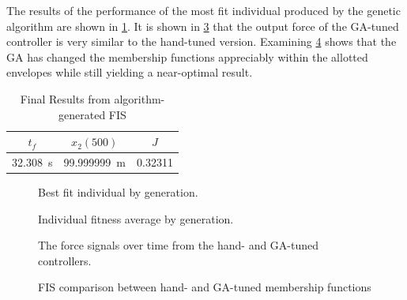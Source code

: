 The results of the performance of the most fit individual produced by the genetic algorithm are shown in
\cref{tab:garesult}. It is shown in \cref{f:accforcecomp} that the output force of the GA-tuned controller is
very similar to the hand-tuned version. Examining \cref{f:fiscomp} shows that the GA has changed the
membership functions appreciably within the allotted envelopes while still yielding a near-optimal result.

\begin{table} \centering \caption{Final Results from algorithm-generated FIS}\label{tab:garesult}
\begin{tabular}{|c|c|c|} \hline $t_f$ & $x_2(500)$ & $J$ \\\hline \SI{32.308}{\second} &
\SI{99.999999}{\metre} &  0.32311 \\\hline \end{tabular} \end{table}

\begin{figure}
    \centering
    \resizebox{0.75\textwidth}{!}{}
    \caption{Best fit individual by generation.}\label{f:popfitness}
\end{figure}

\begin{figure}
    \centering
    \resizebox{0.75\textwidth}{!}{}
    \caption{Individual fitness average by generation.}\label{f:popaverage}
\end{figure}

\begin{figure}
    \centering
    \resizebox{0.75\textwidth}{!}{}
    \caption{The force signals over time from the hand- and GA-tuned controllers.}\label{f:accforcecomp}
\end{figure}

\begin{figure}
    \begin{subfigmatrix}{2}
    \end{subfigmatrix} \caption{FIS comparison between hand- and GA-tuned membership
    functions}\label{f:fiscomp}
\end{figure}


